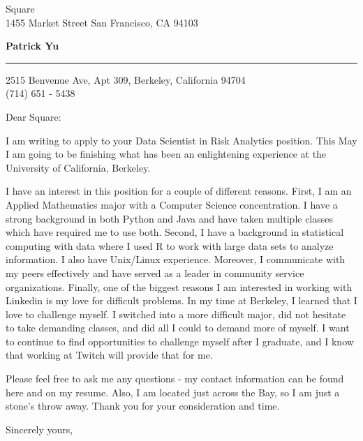\documentclass{letter} %
\begin{document}
\signature{Patrick Yu}           %
\longindentation=0pt                       %
\let\raggedleft\raggedright                %
 
 
\begin{letter}{
Square\\
1455 Market Street
San Francisco, CA 94103}

\begin{flushleft}
{\large\bf Patrick Yu}
\end{flushleft}
\medskip\hrule height 1pt
\begin{flushright}
\hfill 2515 Benvenue Ave, Apt 309, Berkeley, California 94704 \\
\hfill (714) 651 - 5438
\end{flushright} 
\vfill %

 
\opening{Dear Square:} 
 
\noindent I am writing to apply to your Data Scientist in Risk Analytics position. This May I am going to be finishing what has been an enlightening experience at the University of California, Berkeley. 

\noindent I have an interest in this position for a couple of different reasons. First, I am an Applied Mathematics major with a Computer Science concentration. I have a strong background in both Python and Java and have taken multiple classes which have required me to use both. Second, I have a background in statistical computing with data where I used R to work with large data sets to analyze information. I also have Unix/Linux experience.  Moreover, I communicate with my peers effectively and have served as a leader in community service organizations. Finally, one of the biggest reasons I am interested in working with Linkedin is my love for difficult problems. In my time at Berkeley, I learned that I love to challenge myself. I switched into a more difficult major, did not hesitate to take demanding classes, and did all I could to demand more of myself. I want to continue to find opportunities to challenge myself after I graduate, and I know that working at Twitch will provide that for me.

\noindent Please feel free to ask me any questions - my contact information can be found here and on my resume. Also, I am located just across the Bay, so I am just a stone's throw away. Thank you for your consideration and time.
 
\closing{Sincerely yours,} 
 

 

\end{letter}
 
\end{document}
